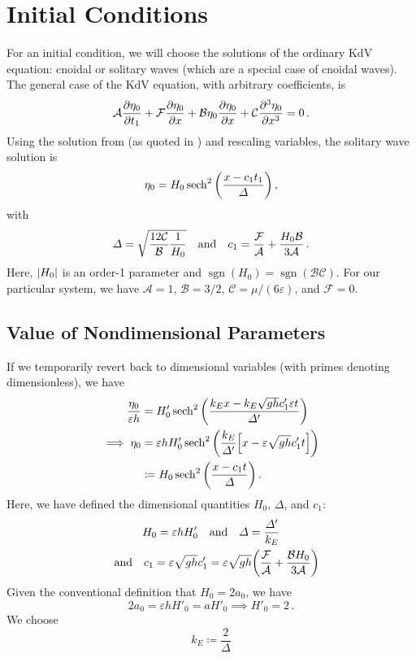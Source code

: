 \documentclass{jfm}
\DeclareMathOperator{\sgn}{sgn}
\renewcommand*{\epsilon}{\varepsilon}
\begin{document}
\section{Initial Conditions}
For an initial condition, we will choose the solutions of the ordinary
KdV equation: cnoidal or solitary waves (which are a special case of
cnoidal waves).
The general case of the KdV equation, with arbitrary coefficients, is
\begin{equation}
  \mathcal{A} \pdv{\eta_0}{t_1} + \mathcal{F} \pdv{\eta_0}{x} + \mathcal{B}
  \eta_0 \pdv{\eta_0}{x} + \mathcal{C} \pdv[3]{\eta_0}{x} = 0 \,.
\end{equation}
Using the solution from \citet{dingemans1997water} (as quoted in
\citealp{brun2018convective}) and rescaling variables, the solitary
wave solution is
\begin{equation}
  \eta_0 = H_0 \sech^2\pqty{\frac{x - c_1 t_1}{\Delta}} \,,
\end{equation}
with
\begin{equation}
  \Delta = \sqrt{\frac{12 \mathcal{C}}{\mathcal{B}} \frac{1}{H_0}}
  \qq{and}
  c_1 = \frac{\mathcal{F}}{\mathcal{A}} + \frac{H_0 \mathcal{B}}{3
    \mathcal{A}} \,.
\end{equation}
Here, $\abs{H_0}$ is an order-1 parameter and $\sgn(H_0) =
\sgn(\mathcal{B} \mathcal{C})$.
For our particular system, we have $\mathcal{A} = 1$, $\mathcal{B} =
3/2$, $\mathcal{C} = \mu/(6\epsilon)$, and $\mathcal{F} = 0$.

\subsection{Value of Nondimensional Parameters}
If we temporarily revert back to dimensional variables (with primes
denoting dimensionless), we have
\begin{equation}
  \begin{split}
  \frac{\eta_0}{\epsilon h} &= H'_0 \sech^2\pqty{\frac{k_E x - k_E
    \sqrt{gh} c_1' \epsilon t}{\Delta'}}
  \\
  \implies
  \eta_0 &= \epsilon h H'_0
  \sech^2\pqty{\frac{k_E}{\Delta'} \bqty{x - \epsilon \sqrt{gh} c_1' t}}
  \\
  &\coloneqq H_0 \sech^2\pqty{\frac{x - c_1 t}{\Delta}} \,.
  \end{split}
\end{equation}
Here, we have defined the dimensional quantities $H_0$, $\Delta$, and $c_1$:
\begin{gather}
  H_0 = \epsilon h H'_0
  \qq{and}
  \Delta = \frac{\Delta'}{k_E}
  \label{eq:nondim_solitary_params}
  \\
  \qq{and}
  c_1 = \epsilon \sqrt{gh} c_1' = \epsilon \sqrt{gh} \pqty{
    \frac{\mathcal{F}}{\mathcal{A}} +
    \frac{\mathcal{B} H_0}{3 \mathcal{A}} }
\end{gather}
Given the conventional definition that $H_0 = 2 a_0$, we have
\begin{equation}
  2 a_0 = \epsilon h H'_0 = a H'_0 \implies H'_0 = 2 \,.
\end{equation}
We choose
\begin{equation}
  k_E \coloneqq \frac{2}{\Delta}
\end{equation}
\end{document}
